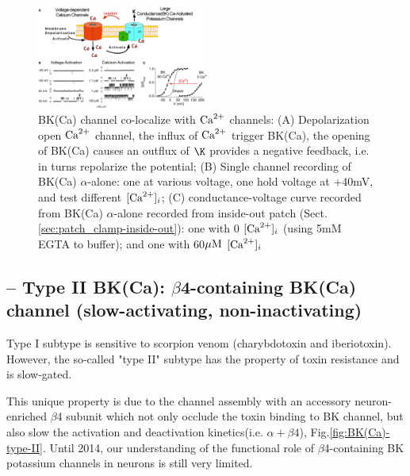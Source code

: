\begin{figure}[hbt]
  \centerline{\includegraphics[height=3.4cm,
    angle=0]{./images/BK(Ca)-type-I.eps}}
\caption{BK(Ca) channel co-localize with ${\text{Ca}^{2+}}$ channels: (A) Depolarization
open ${\text{Ca}^{2+}}$ channel, the influx of ${\text{Ca}^{2+}}$ trigger BK(Ca), the opening of BK(Ca)
causes an outflux of $\K$ provides a negative feedback, i.e. in turns repolarize
the potential; (B) Single channel recording of BK(Ca) $\alpha$-alone: one at
various voltage, one hold voltage at +40mV, and test different $[{\text{Ca}^{2+}}]_i$; 
(C) conductance-voltage curve recorded from BK(Ca) $\alpha$-alone recorded from
inside-out patch (Sect.\ref{sec:patch_clamp-inside-out}): one with 0 $[{\text{Ca}^{2+}}]_i$
(using 5mM EGTA to buffer); and one with 60${\mu\text{M}}$ $[{\text{Ca}^{2+}}]_i$ }
\label{fig:BK(Ca)-type-I}
\end{figure}

\subsection{-- Type II BK(Ca): $\beta$4-containing BK(Ca) channel
(slow-activating, non-inactivating)}
\label{sec:BK(Ca)-type-II}

Type I subtype is sensitive to  scorpion venom (charybdotoxin and iberiotoxin).
However, the so-called "type II" subtype has the property of toxin resistance
and is slow-gated.

This unique property is due to the channel assembly with an accessory
neuron-enriched $\beta$4 subunit which not only occlude the toxin binding to BK
channel, but also slow the activation and deactivation kinetics(i.e.
$\alpha+\beta4$), Fig.\ref{fig:BK(Ca)-type-II}.
Until 2014, our understanding of the functional role of $\beta$4-containing BK
potassium channels in neurons is still very limited.

